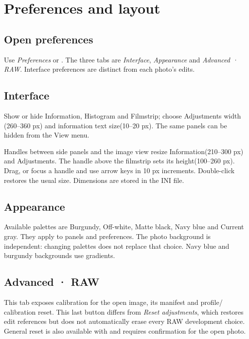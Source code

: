 \chapter{Preferences and layout}
\section{Open preferences}
Use \emph{Preferences} or . The three tabs are
\emph{Interface}, \emph{Appearance} and \emph{Advanced · RAW}.
Interface preferences are distinct from each photo's edits.

\section{Interface}
Show or hide Information, Histogram and Filmstrip; choose Adjustments width
(260--360 px) and information text size(10--20 px). The same panels can be
hidden from the View menu.

Handles between side panels and the image view resize Information(210--300 px)
and Adjustments. The handle above the filmstrip sets its height(100--260 px).
Drag, or focus a handle and use arrow keys in 10 px increments.
Double-click restores the usual size. Dimensions are stored in the INI file.

\section{Appearance}
Available palettes are Burgundy, Off-white, Matte black, Navy blue and Current
gray. They apply to panels and preferences. The photo background is independent:
changing palettes does not replace that choice. Navy blue and burgundy
backgrounds use gradients.


\section{Advanced · RAW}
This tab exposes calibration for the open image, its manifest and profile/
calibration reset. This last button differs from \emph{Reset adjustments},
which restores edit references but does not automatically erase every RAW
development choice. General reset is also available with
 and requires confirmation for the open photo.

